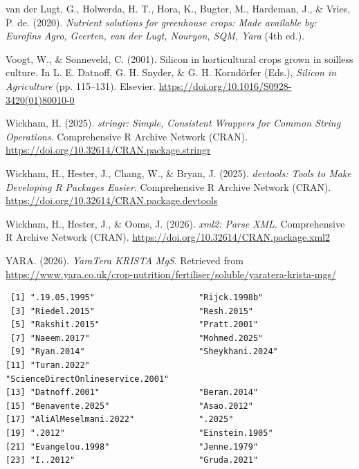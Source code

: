 \documentclass[
  letterpaper,
  DIV=11,
  numbers=noendperiod]{scrreprt}
\newlength{\cslhangindent}
\newenvironment{CSLReferences}[2] %
 {\begin{list}{}{%
  \setlength{\itemindent}{0pt}
  \setlength{\leftmargin}{0pt}
  \setlength{\parsep}{0pt}
  \ifodd #1
   \setlength{\leftmargin}{\cslhangindent}
   \setlength{\itemindent}{-1\cslhangindent}
  \fi
  \setlength{\itemsep}{#2\baselineskip}}}
 {\end{list}}
\newcounter{frontmatterpages}
\newcommand{\restorefrontmatter}{%
  \pagenumbering{roman}%
  \setcounter{page}{\value{frontmatterpages}}%
}
\begin{document}
\begin{CSLReferences}{1}{0}
van der Lugt, G., Holwerda, H. T., Hora, K., Bugter, M., Hardeman, J.,
\& Vries, P. de. (2020). \emph{{Nutrient solutions for greenhouse crops:
Made available by: Eurofins Agro, Geerten, van der Lugt, Nouryon, SQM,
Yara}} (4th ed.).

Voogt, W., \& Sonneveld, C. (2001). {Silicon in horticultural crops
grown in soilless culture}. In L. E. Datnoff, G. H. Snyder, \& G. H.
Korndörfer (Eds.), \emph{{Silicon in Agriculture}} (pp. 115--131).
Elsevier. \url{https://doi.org/10.1016/S0928-3420(01)80010-0}

Wickham, H. (2025). \emph{{stringr: Simple, Consistent Wrappers for
Common String Operations}}. {Comprehensive R Archive Network (CRAN)}.
\url{https://doi.org/10.32614/CRAN.package.stringr}

Wickham, H., Hester, J., Chang, W., \& Bryan, J. (2025).
\emph{{devtools: Tools to Make Developing R Packages Easier}}.
{Comprehensive R Archive Network (CRAN)}.
\url{https://doi.org/10.32614/CRAN.package.devtools}

Wickham, H., Hester, J., \& Ooms, J. (2026). \emph{{xml2: Parse XML}}.
{Comprehensive R Archive Network (CRAN)}.
\url{https://doi.org/10.32614/CRAN.package.xml2}

YARA. (2026). \emph{{YaraTera KRISTA MgS}}. Retrieved from
\url{https://www.yara.co.uk/crop-nutrition/fertiliser/soluble/yaratera-krista-mgs/}

\end{CSLReferences}

\clearpage
\restorefrontmatter

\begin{verbatim}
 [1] ".19.05.1995"                     "Rijck.1998b"                    
 [3] "Riedel.2015"                     "Resh.2015"                      
 [5] "Rakshit.2015"                    "Pratt.2001"                     
 [7] "Naeem.2017"                      "Mohmed.2025"                    
 [9] "Ryan.2014"                       "Sheykhani.2024"                 
[11] "Turan.2022"                      "ScienceDirectOnlineservice.2001"
[13] "Datnoff.2001"                    "Beran.2014"                     
[15] "Benavente.2025"                  "Asao.2012"                      
[17] "AliAlMeselmani.2022"             ".2025"                          
[19] ".2012"                           "Einstein.1905"                  
[21] "Evangelou.1998"                  "Jenne.1979"                     
[23] "I..2012"                         "Gruda.2021"                     
\end{verbatim}
\end{document}
